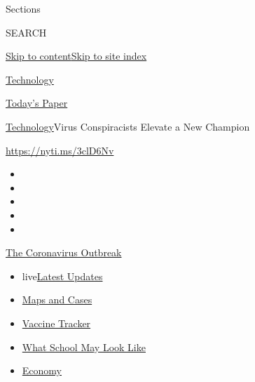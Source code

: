 Sections

SEARCH

\protect\hyperlink{site-content}{Skip to
content}\protect\hyperlink{site-index}{Skip to site index}

\href{https://www.nytimes3xbfgragh.onion/section/technology}{Technology}

\href{https://myaccount.nytimes3xbfgragh.onion/auth/login?response_type=cookie\&client_id=vi}{}

\href{https://www.nytimes3xbfgragh.onion/section/todayspaper}{Today's
Paper}

\href{/section/technology}{Technology}\textbar{}Virus Conspiracists
Elevate a New Champion

\url{https://nyti.ms/3clD6Nv}

\begin{itemize}
\item
\item
\item
\item
\item
\end{itemize}

\href{https://www.nytimes3xbfgragh.onion/news-event/coronavirus?action=click\&pgtype=Article\&state=default\&region=TOP_BANNER\&context=storylines_menu}{The
Coronavirus Outbreak}

\begin{itemize}
\tightlist
\item
  live\href{https://www.nytimes3xbfgragh.onion/2020/08/01/world/coronavirus-covid-19.html?action=click\&pgtype=Article\&state=default\&region=TOP_BANNER\&context=storylines_menu}{Latest
  Updates}
\item
  \href{https://www.nytimes3xbfgragh.onion/interactive/2020/us/coronavirus-us-cases.html?action=click\&pgtype=Article\&state=default\&region=TOP_BANNER\&context=storylines_menu}{Maps
  and Cases}
\item
  \href{https://www.nytimes3xbfgragh.onion/interactive/2020/science/coronavirus-vaccine-tracker.html?action=click\&pgtype=Article\&state=default\&region=TOP_BANNER\&context=storylines_menu}{Vaccine
  Tracker}
\item
  \href{https://www.nytimes3xbfgragh.onion/interactive/2020/07/29/us/schools-reopening-coronavirus.html?action=click\&pgtype=Article\&state=default\&region=TOP_BANNER\&context=storylines_menu}{What
  School May Look Like}
\item
  \href{https://www.nytimes3xbfgragh.onion/live/2020/07/31/business/stock-market-today-coronavirus?action=click\&pgtype=Article\&state=default\&region=TOP_BANNER\&context=storylines_menu}{Economy}
\end{itemize}


